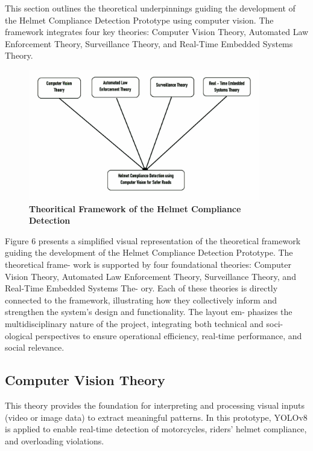 \begin{refsection}
\begin{itemize}
\begin{itemize}
This section outlines the theoretical underpinnings guiding the development of the Helmet Compliance Detection Prototype using computer vision. The framework integrates four key theories: Computer Vision Theory, Automated Law Enforcement Theory, Surveillance Theory, and Real-Time Embedded Systems Theory.


\begin{figure}[H]
    \centering
    \includegraphics[width=0.9\textwidth]{figures/Fig 6.jpg}
    \caption{\textbf{Theoritical Framework of the Helmet Compliance Detection }}
    \label{figures/Fig 6.jpg}
\end{figure}
Figure 6 presents a simplified visual representation of the theoretical framework guiding the development of the Helmet Compliance Detection Prototype. The theoretical frame- work is supported by four foundational theories: Computer Vision Theory, Automated Law Enforcement Theory, Surveillance Theory, and Real-Time Embedded Systems The- ory. Each of these theories is directly connected to the framework, illustrating how they collectively inform and strengthen the system’s design and functionality. The layout em- phasizes the multidisciplinary nature of the project, integrating both technical and soci- ological perspectives to ensure operational efficiency, real-time performance, and social relevance.


\subsection{Computer Vision Theory}
This theory provides the foundation for interpreting and processing visual inputs (video or image data) to extract meaningful patterns. In this prototype, YOLOv8 is applied to enable real-time detection of motorcycles, riders’ helmet compliance, and overloading violations.




\end{itemize}
\end{itemize}
\end{refsection}
